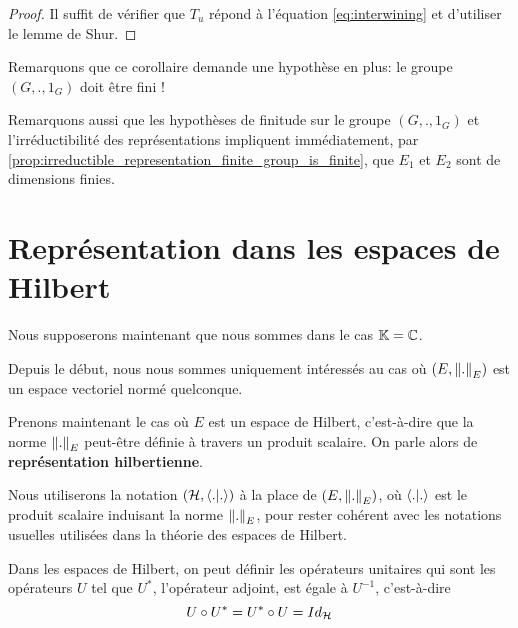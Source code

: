 \ifdefined\outputproof
\begin{proof}
	Il suffit de vérifier que $T_{u}$ répond à l'équation \ref{eq:interwining}
	et d'utiliser le lemme de Shur.
\end{proof}
\fi

Remarquons que ce corollaire demande une hypothèse en plus: le
groupe $(G, ., 1_{G})$ doit être fini !

Remarquons aussi que les hypothèses de finitude sur le groupe $(G, ., 1_{G})$ et
l'irréductibilité des représentations impliquent immédiatement, par
\ref{prop:irreductible_representation_finite_group_is_finite}, que $E_{1}$ et
$E_{2}$ sont de dimensions finies.



\section{Représentation dans les espaces de Hilbert}

Nous supposerons maintenant que nous sommes dans le cas $\mathbb{K} = \mathbb{C}$.

Depuis le début, nous nous sommes uniquement intéressés au cas où $(E,
\norm{.}_{E})$ est un espace vectoriel normé quelconque.

Prenons maintenant le cas où $E$ est un espace de Hilbert,
c'est-à-dire que la norme $\norm{.}_{E}$ peut-être définie à travers un
produit scalaire. On parle alors de \textbf{représentation hilbertienne}.

Nous utiliserons la notation $(\mathcal{H}, \bra{.}\ket{.})$ à la place de $(E,
\norm{.}_{E})$, où $\bra{.}\ket{.}$ est le produit scalaire induisant la
norme $\norm{.}_{E}$, pour rester cohérent avec les notations usuelles
utilisées dans la théorie des espaces de Hilbert.

Dans les espaces de Hilbert, on peut définir les opérateurs unitaires qui
sont les opérateurs $U$ tel que $U^{*}$, l'opérateur adjoint, est égale à
$U^{-1}$, c'est-à-dire
\begin{equation}
	U \circ U^{*} = U^{*} \circ U = Id_{\mathcal{H}}
\end{equation}

